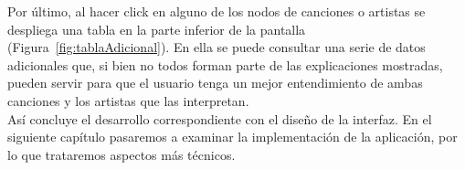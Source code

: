 Por último, al hacer click en alguno de los nodos de canciones o artistas se despliega una tabla en la parte inferior de la pantalla (Figura~\ref{fig:tablaAdicional}). En ella se puede consultar una serie de datos adicionales que, si bien no todos forman parte de las explicaciones mostradas, pueden servir para que el usuario tenga un mejor entendimiento de ambas canciones y los artistas que las interpretan.\\

Así concluye el desarrollo correspondiente con el diseño de la interfaz. En el siguiente capítulo pasaremos a examinar la implementación de la aplicación, por lo que trataremos aspectos más técnicos.\\